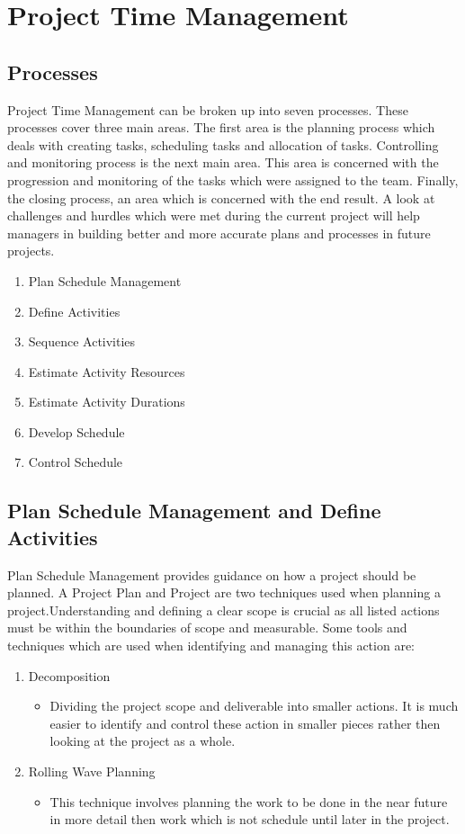 \chapter{Project Time Management}

\section{Processes}

Project Time Management can be broken up into seven processes. These processes cover three main areas. The first area is the planning process which deals with creating tasks, scheduling tasks and allocation of tasks. Controlling and monitoring process is the next main area. This area is concerned with the progression and monitoring of the tasks which were assigned to the team. Finally, the closing process, an area which is concerned with the end result. A look at challenges and hurdles which were met during the current project will help managers in building better and more accurate plans and processes in future projects.

\begin{enumerate}
\item Plan Schedule Management
\item Define Activities
\item Sequence Activities
\item Estimate Activity Resources
\item Estimate Activity Durations
\item Develop Schedule
\item Control Schedule
\end{enumerate}

\section{Plan Schedule Management and Define Activities}

Plan Schedule Management provides guidance on how a project should be planned. A Project Plan and Project are two techniques used when planning a project.Understanding and defining a clear scope is crucial as all listed actions must be within the boundaries of scope and measurable.
Some tools and techniques which are used when identifying and managing this action are:

\begin{enumerate}
\item Decomposition
\begin{itemize}
\item Dividing the project scope and deliverable into smaller actions. It is much easier to identify and control these action in smaller pieces rather then looking at the project as a whole.
\end{itemize}
\item Rolling Wave Planning
\begin{itemize}
\item This technique involves planning the work to be done in the near future in more detail then work which is not schedule until later in the project.
\end{itemize}
\end{enumerate}


